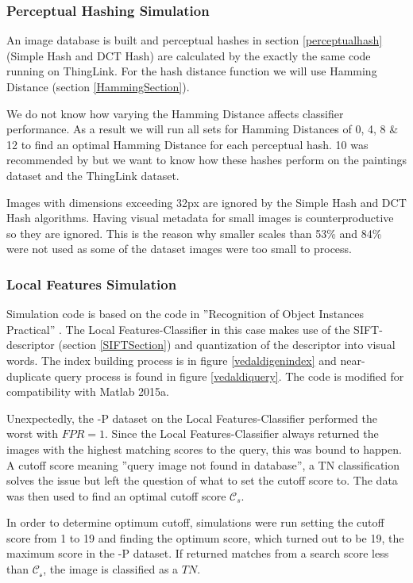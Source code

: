 \documentclass[english,12pt,a4paper,pdftex,elec,utf8, table]{aaltothesis}
\begin{document}
\subsubsection{Perceptual Hashing Simulation}
An image database is built and perceptual hashes in section \ref{perceptualhash} (Simple Hash and DCT Hash) are calculated by the exactly the same code running on ThingLink. For the hash distance function we will use Hamming Distance (section \ref{HammingSection}).

We do not know how varying the Hamming Distance affects classifier performance. As a result we will run all sets for Hamming Distances of 0, 4, 8 \& 12 to find an optimal Hamming Distance for each perceptual hash. 10 was recommended by \cite{Zauner2010} but we want to know how these hashes perform on the paintings dataset and the ThingLink dataset.

Images with dimensions exceeding 32px are ignored by the Simple Hash and DCT Hash algorithms. Having visual metadata for small images is counterproductive so they are ignored. This is the reason why smaller scales than 53\% and 84\% were not used as some of the dataset images were too small to process.

\subsubsection{Local Features Simulation}
Simulation code is based on the code in ''Recognition of Object Instances Practical'' \cite{Vedaldi2012}. The Local Features-Classifier in this case makes use of the SIFT-descriptor (section \ref{SIFTSection}) and quantization of the descriptor into visual words. The index building process is in figure \ref{vedaldigenindex} and near-duplicate query process is found in figure \ref{vedaldiquery}. The code is modified for compatibility with Matlab 2015a.

Unexpectedly, the -P dataset on the Local Features-Classifier performed the worst with $FPR = 1$. Since the Local Features-Classifier always returned the images with the highest matching scores to the query, this was bound to happen. A cutoff score meaning ''query image not found in database'', a TN classification solves the issue but left the question of what to set the cutoff score to. The data was then used to find an optimal cutoff score $\mathcal{C}_s$.

In order to determine optimum cutoff, simulations were run setting the cutoff score from 1 to 19 and finding the optimum score, which turned out to be 19, the maximum score in the -P dataset. If returned matches from a search score less than $\mathcal{C_s}$, the image is classified as a $TN$.
\end{document}
